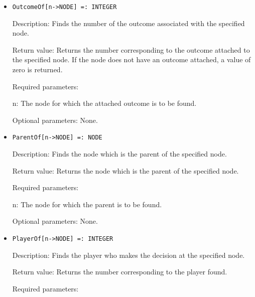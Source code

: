 \begin{itemize}
\item

\protect \large \begin{verbatim}
OutcomeOf[n->NODE] =: INTEGER
\end{verbatim}\normalsize

\bd

\item
[Description:] Finds the number of the outcome associated with the
specified node.
\item
[Return value:] Returns the number corresponding to the outcome
attached to the specified node.  If the node does not have an outcome
attached, a value of zero is returned.
\item
[Required parameters:]\hfil\null
	
\bd
\item
[n:] The node for which the attached outcome is to be found.
\ed

\item
[Optional parameters:] None.
\ed

\item

\protect \large \begin{verbatim}
ParentOf[n->NODE] =: NODE
\end{verbatim}\normalsize

\bd
\item
[Description:] Finds the node which is the parent of the specified
node.
\item
[Return value:] Returns the node which is the parent of the specified
node.
\item
[Required parameters:]\hfil\null
	
\bd
\item
[n:] The node for which the parent is to be found.
\ed

\item
[Optional parameters:] None.
\ed

\item
\protect \large \begin{verbatim}
PlayerOf[n->NODE] =: INTEGER
\end{verbatim}\normalsize

\bd
\item
[Description:] Finds the player who makes the decision at the
specified node.
\item
[Return value:] Returns the number corresponding to the player found.
\item
[Required parameters:]\hfil\null


\end{itemize}
